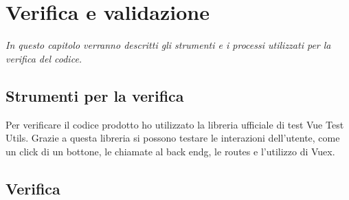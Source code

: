 
\chapter{Verifica e validazione}
\label{cap:verifica-validazione}

\textit{In questo capitolo verranno descritti gli strumenti e i processi utilizzati per la verifica del codice.}

\section{Strumenti per la verifica}
\label{sec:strumenti-per-verifica}

Per verificare il codice prodotto ho utilizzato la libreria ufficiale di test Vue Test Utils. Grazie a questa libreria si possono testare le interazioni dell'utente, come un click di un bottone, le chiamate al \gls{back endg}, le routes e l'utilizzo di Vuex.

\section{Verifica}
\label{sec:verifica}

